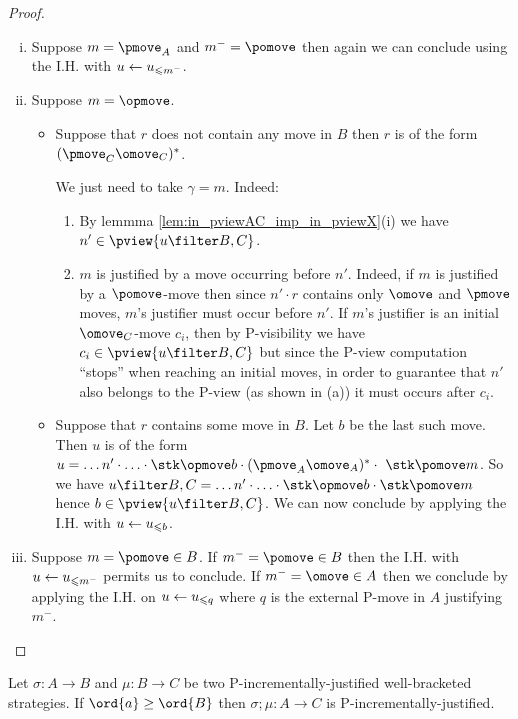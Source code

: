 \begin{proof}
\begin{enumerate}[i.]
\item Suppose $m = \pmove_A$ and $m^- = \pomove$ then again we can conclude using the I.H. with $u \leftarrow u_{\leqslant m^-}$.

\item Suppose $m = \opmove$.
\begin{itemize}[-]
\item Suppose that $r$ does not contain any move in $B$  then $r$ is of the form $(\pmove_C \omove_C)^*$. 

We just need to take $\gamma = m$. 
Indeed:
\begin{enumerate}
\item By lemmma \ref{lem:in_pviewAC_imp_in_pviewX}(i)
we have $n'\in \pview{u\filter B,C}$.

\item  $m$ is justified by a move occurring before $n'$. 
Indeed, if $m$ is justified by a $\pomove$-move then since $n' \cdot r$ contains only $\omove$ and $\pmove$ moves, $m$'s justifier must occur before $n'$.
If $m$'s justifier is an initial $\omove_C$-move $c_i$, then 
by P-visibility we have $c_i \in \pview{u\filter B,C}$
but since the P-view computation ``stops'' when reaching an initial moves, in order to guarantee that $n'$ also belongs to the P-view (as shown in (a)) it must
occurs after $c_i$.
\end{enumerate}


\item Suppose that $r$ contains some move in $B$. Let $b$ be the last such move. Then $u$ is of the form $u = \ldots n' \cdot \ldots \cdot \stk\opmove  b \cdot (\pmove_A \omove_A)^* \cdot\ \stk\pomove m $. 
So we have
$u\filter B,C = \ldots n' \cdot \ldots \cdot \stk\opmove  b \cdot \stk\pomove m $ hence $b \in \pview{u\filter B,C}$. We can now 
conclude by applying the I.H. with $u \leftarrow u_{\leqslant b}$.
\end{itemize}

\item Suppose $m = \pomove \in B$.
If $m^- = \pomove \in B$ then the I.H. with $u \leftarrow u_{\leqslant m^-}$ permits us to conclude.
If $m^- = \omove \in A$ then we conclude by applying the I.H. on $u \leftarrow u_{\leqslant q}$ where $q$ is the external P-move in $A$ justifying $m^-$.
\end{enumerate}
\end{proof}

\begin{conjecture}
Let $\sigma : A \rightarrow B$ and $\mu : B \rightarrow C$
be two P-incrementally-justified well-bracketed
strategies. 
If $\ord{a} \geq \ord{B}$ then $\sigma ; \mu : A\rightarrow C$
is P-incrementally-justified.
\end{conjecture}

